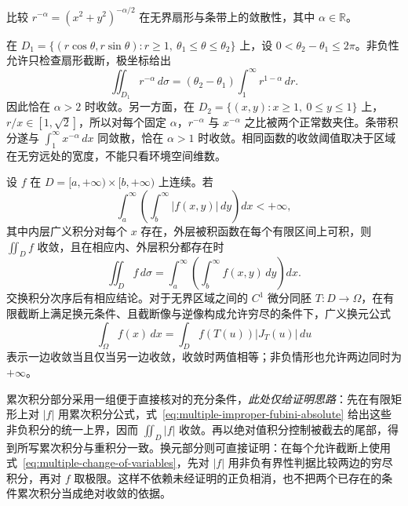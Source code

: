 \begin{example}
\label{ex:multiple-infinity-sector-strip}
比较 $r^{-\alpha}=(x^2+y^2)^{-\alpha/2}$ 在无界扇形与条带上的敛散性，其中 $\alpha\in\mathbb R$。
\end{example}
\begin{solve}
在 $D_1=\{(r\cos\theta,r\sin\theta):r\geq1,\ \theta_1\leq\theta\leq\theta_2\}$ 上，设 $0<\theta_2-\theta_1\leq2\pi$。非负性允许只检查扇形截断，极坐标给出
\[
    \iint_{D_1}r^{-\alpha}\,d\sigma
    =(\theta_2-\theta_1)\int_1^\infty r^{1-\alpha}\,dr.
\]
因此恰在 $\alpha>2$ 时收敛。另一方面，在 $D_2=\{(x,y):x\geq1,\ 0\leq y\leq1\}$ 上，$r/x\in[1,\sqrt2]$，所以对每个固定 $\alpha$，$r^{-\alpha}$ 与 $x^{-\alpha}$ 之比被两个正常数夹住。条带积分遂与 $\int_1^\infty x^{-\alpha}\,dx$ 同敛散，恰在 $\alpha>1$ 时收敛。相同函数的收敛阈值取决于区域在无穷远处的宽度，不能只看环境空间维数。
\end{solve}

\begin{theorem}[广义重积分的累次积分与换元]
\label{thm:multiple-improper-fubini-change}
设 $f$ 在 $D=[a,+\infty)\times[b,+\infty)$ 上连续。若
\begin{equation}
    \int_a^\infty\left(\int_b^\infty|f(x,y)|\,dy\right)dx<+\infty,
    \label{eq:multiple-improper-fubini-absolute}
\end{equation}
其中内层广义积分对每个 $x$ 存在，外层被积函数在每个有限区间上可积，则 $\iint_Df$ 收敛，且在相应内、外层积分都存在时
\[
    \iint_Df\,d\sigma
    =\int_a^\infty\left(\int_b^\infty f(x,y)\,dy\right)dx.
\]
交换积分次序后有相应结论。对于无界区域之间的 $C^1$ 微分同胚 $T:D\to\Omega$，在有限截断上满足换元条件、且截断像与逆像构成允许穷尽的条件下，广义换元公式
\begin{equation}
    \int_\Omega f(x)\,dx=\int_Df(T(u))|J_T(u)|\,du
    \label{eq:multiple-improper-change-of-variables}
\end{equation}
表示一边收敛当且仅当另一边收敛，收敛时两值相等；非负情形也允许两边同时为 $+\infty$。
\end{theorem}

累次积分部分采用一组便于直接核对的充分条件，\emph{此处仅给证明思路}：先在有限矩形上对 $|f|$ 用累次积分公式，式~\eqref{eq:multiple-improper-fubini-absolute} 给出这些非负积分的统一上界，因而 $\iint_D|f|$ 收敛。再以绝对值积分控制被截去的尾部，得到所写累次积分与重积分一致。换元部分则可直接证明：在每个允许截断上使用式~\eqref{eq:multiple-change-of-variables}，先对 $|f|$ 用非负有界性判据比较两边的穷尽积分，再对 $f$ 取极限。这样不依赖未经证明的正负相消，也不把两个已存在的条件累次积分当成绝对收敛的依据。

